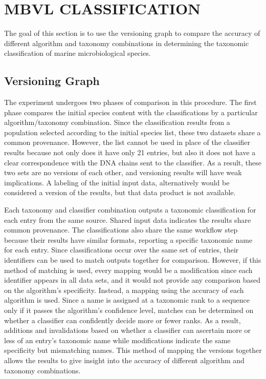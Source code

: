 
\chapter{MBVL CLASSIFICATION}\label{ch:mbvl}

The goal of this section is to use the versioning graph to compare the accuracy of different algorithm and taxonomy combinations in determining the taxonomic classification of marine microbiological species.

\section{Versioning Graph}

The experiment undergoes two phases of comparison in this procedure.
The first phase compares the initial species content with the classifications by a particular algorithm/taxonomy combination.
Since the classification results from a population selected according to the initial species list, these two datasets share a common provenance.
However, the list cannot be used in place of the classifier results because not only does it have only 21 entries, but also it does not have a clear correspondence with the DNA chains sent to the classifier.
As a result, these two sets are no versions of each other, and versioning results will have weak implications.
A labeling of the initial input data, alternatively would be considered a version of the results, but that data product is not available.

Each taxonomy and classifier combination outputs a taxonomic classification for each entry from the same source.
Shared input data indicates the results share common provenance.
The classifications also share the same workflow step because their results have similar formats, reporting a specific taxonomic name for each entry.
Since classifications occur over the same set of entries, their identifiers can be used to match outputs together for comparison.
However, if this method of matching is used, every mapping would be a modification since each identifier appears in all data sets, and it would not provide any comparison based on the algorithm's specificity.
Instead, a mapping using the accuracy of each algorithm is used.
Since a name is assigned at a taxonomic rank to a sequence only if it passes the algorithm's confidence level, matches can be determined on whether a classifier can confidently decide more or fewer ranks.
As a result, additions and invalidations based on whether a classifier can ascertain more or less of an entry's taxonomic name while modifications indicate the same specificity but mismatching names.
This method of mapping the versions together allows the results to give insight into the accuracy of different algorithm and taxonomy combinations.

